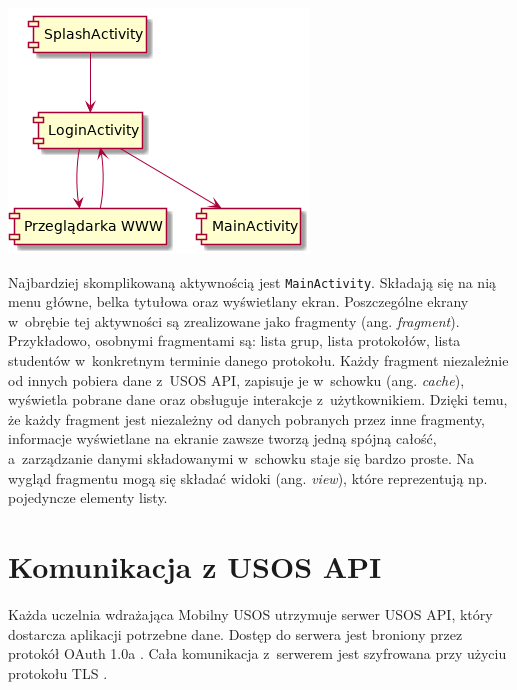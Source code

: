 \documentclass{pracamgr}
\begin{document}
\begingroup
\centering
\includegraphics[scale=0.7]{img/activities.png}
\label{fig:activities}
\medskip
\endgroup

Najbardziej skomplikowaną aktywnością jest \texttt{MainActivity}. Składają się na nią
menu główne, belka tytułowa oraz wyświetlany ekran. Poszczególne ekrany w~obrębie
tej aktywności są zrealizowane jako fragmenty (ang. \textit{fragment}). Przykładowo,
osobnymi fragmentami są: lista grup, lista protokołów, lista studentów w~konkretnym
terminie danego protokołu. Każdy fragment niezależnie od innych pobiera
dane z~USOS API, zapisuje je w~schowku (ang. \textit{cache}),
wyświetla pobrane dane oraz obsługuje interakcje z~użytkownikiem. Dzięki temu,
że każdy fragment jest niezależny od danych pobranych przez inne fragmenty, informacje
wyświetlane na ekranie zawsze tworzą jedną spójną całość, a~zarządzanie danymi
składowanymi w~schowku staje się bardzo proste. Na wygląd fragmentu mogą się
składać widoki (ang. \textit{view}), które reprezentują np. pojedyncze elementy
listy.

\section{Komunikacja z USOS API}

Każda uczelnia wdrażająca Mobilny USOS utrzymuje serwer USOS API, który dostarcza
aplikacji potrzebne dane. Dostęp do serwera jest broniony przez protokół
OAuth 1.0a \cite{oauth}. Cała komunikacja z~serwerem jest szyfrowana przy użyciu
protokołu TLS \cite{tls12}.
\end{document}
